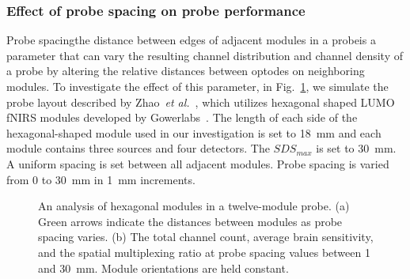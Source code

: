 \subsubsection{Effect of probe spacing on probe performance}
Probe spacing\textemdash the distance between edges of adjacent modules in a probe\textemdash is a parameter that can vary the resulting channel distribution and channel density of a probe by altering the relative distances between optodes on neighboring modules. To investigate the effect of this parameter, in Fig.~\ref{fig:spacing}, we simulate the probe layout described by Zhao~\emph{et al.}~\cite{Zhao2019}, which utilizes hexagonal shaped LUMO fNIRS modules developed by Gowerlabs~\cite{Gowerlabs2019}. The length of each side of the hexagonal-shaped module used in our investigation is set to 18~mm and each module contains three sources and four detectors. The $SDS_{max}$ is set to 30~mm. A uniform spacing is set between all adjacent modules. Probe spacing is varied from 0 to 30~mm in 1~mm increments. 


\begin{figure}
\begin{center}
\end{center}
\caption {An analysis of hexagonal modules in a twelve-module probe. (a) Green arrows indicate the distances between modules as probe spacing varies. (b) The total channel count, average brain sensitivity, and the spatial multiplexing ratio at probe spacing values between 1 and 30~mm. Module orientations are held constant.} \label{fig:spacing}
\end{figure} 

